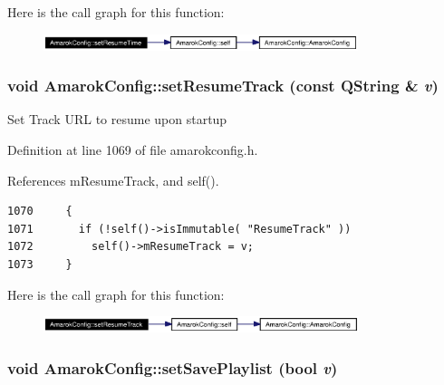 Here is the call graph for this function:\begin{figure}[H]
\begin{center}
\leavevmode
\includegraphics[width=260pt]{classAmarokConfig_AmarokConfige113_cgraph}
\end{center}
\end{figure}
\subsubsection{\setlength{\rightskip}{0pt plus 5cm}void Amarok\-Config::set\-Resume\-Track (const QString \& {\em v})\hspace{0.3cm}{\tt  [inline, static]}}\label{classAmarokConfig_AmarokConfige111}


Set Track URL to resume upon startup 

Definition at line 1069 of file amarokconfig.h.

References m\-Resume\-Track, and self().



\footnotesize\begin{verbatim}1070     {
1071       if (!self()->isImmutable( "ResumeTrack" ))
1072         self()->mResumeTrack = v;
1073     }
\end{verbatim}\normalsize 


Here is the call graph for this function:\begin{figure}[H]
\begin{center}
\leavevmode
\includegraphics[width=261pt]{classAmarokConfig_AmarokConfige111_cgraph}
\end{center}
\end{figure}
\subsubsection{\setlength{\rightskip}{0pt plus 5cm}void Amarok\-Config::set\-Save\-Playlist (bool {\em v})\hspace{0.3cm}{\tt  [inline, static]}}\label{classAmarokConfig_AmarokConfige9}


